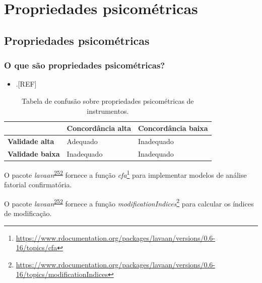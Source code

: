\documentclass[
  a4paper,
]{book}
\providecommand{\tightlist}{%
  \setlength{\itemsep}{0pt}\setlength{\parskip}{0pt}}
\renewcommand{\href}[2]{#2\footnote{\url{#1}}}
\newenvironment{infobox}[1]
  {
  \begin{itemize}
  \renewcommand{\labelitemi}{
    \raisebox{-.7\height}[0pt][0pt]{
      {\setkeys{Gin}{width=3em,keepaspectratio}
        \texttt{[image: \#1]}}
    }
  }
  \setlength{\fboxsep}{1em}
  \begin{blackbox}
  \item
  }
  {
  \end{blackbox}
  \end{itemize}
  }
\begin{document}
\hypertarget{propriedades-psicometricas}{%
\chapter{\texorpdfstring{\textbf{Propriedades psicométricas}}{Propriedades psicométricas}}\label{propriedades-psicometricas}}

\hypertarget{propriedades-psicomuxe9tricas}{%
\section{Propriedades psicométricas}\label{propriedades-psicomuxe9tricas}}

\hypertarget{o-que-suxe3o-propriedades-psicomuxe9tricas}{%
\subsection{O que são propriedades psicométricas?}\label{o-que-suxe3o-propriedades-psicomuxe9tricas}}

\begin{itemize}
\tightlist
\item
  .{[}REF{]}
\end{itemize}

\begin{table}

\caption{\label{tab:crosstable-psicometria}Tabela de confusão sobre propriedades psicométricas de instrumentos.}
\centering
\begin{tabu} to 
\toprule
\textbf{ } & \textbf{Concordância alta} & \textbf{Concordância baixa}\\
\midrule
\textbf{Validade alta} & Adequado & Inadequado\\
\textbf{Validade baixa} & Inadequado & Inadequado\\
\bottomrule
\end{tabu}
\end{table}

\begin{infobox}{images/Rlogo}
O pacote \emph{lavaan}\textsuperscript{\protect\hyperlink{ref-lavaan}{252}} fornece a função \href{https://www.rdocumentation.org/packages/lavaan/versions/0.6-16/topics/cfa}{\emph{cfa}} para implementar modelos de análise fatorial confirmatória.

\end{infobox}

\begin{infobox}{images/Rlogo}
O pacote \emph{lavaan}\textsuperscript{\protect\hyperlink{ref-lavaan}{252}} fornece a função \href{https://www.rdocumentation.org/packages/lavaan/versions/0.6-16/topics/modificationIndices}{\emph{modificationIndices}} para calcular os índices de modificação.

\end{infobox}
\end{document}
